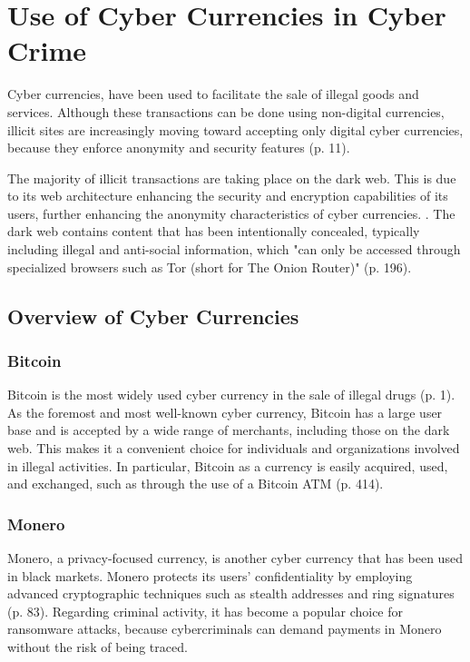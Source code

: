 \chapter{Use of Cyber Currencies in Cyber Crime}

Cyber currencies, have been used to facilitate the sale of illegal goods and services. Although these transactions can be done using non-digital currencies, illicit sites are increasingly moving toward accepting only digital cyber currencies, because they enforce anonymity and security features \cite{ablon_markets_2014} (p. 11). 

The majority of illicit transactions are taking place on the dark web. This is due to its web architecture enhancing the security and encryption capabilities of its users, further enhancing the anonymity characteristics of cyber currencies. \cite{ablon_markets_2014}. The dark web contains content that has been intentionally concealed, typically including illegal and anti-social information, which "can only be accessed through specialized browsers such as Tor (short for The Onion Router)" \cite{weimann_going_2016} (p. 196).

\section{Overview of Cyber Currencies}

\subsection*{Bitcoin}
Bitcoin is the most widely used cyber currency in the sale of illegal drugs \cite{kim_get_2022} (p. 1). As the foremost and most well-known cyber currency, Bitcoin has a large user base and is accepted by a wide range of merchants, including those on the dark web. This makes it a convenient choice for individuals and organizations involved in illegal activities. In particular, Bitcoin as a currency is easily acquired, used, and exchanged, such as through the use of a Bitcoin ATM \cite{irwin_use_2016} (p. 414).

\subsection*{Monero}
Monero, a privacy-focused currency, is another cyber currency that has been used in black markets. Monero protects its users' confidentiality by employing advanced cryptographic techniques such as stealth addresses and ring signatures \cite{averin_review_2020} (p. 83). Regarding criminal activity, it has become a popular choice for ransomware attacks, because cybercriminals can demand payments in Monero without the risk of being traced.


